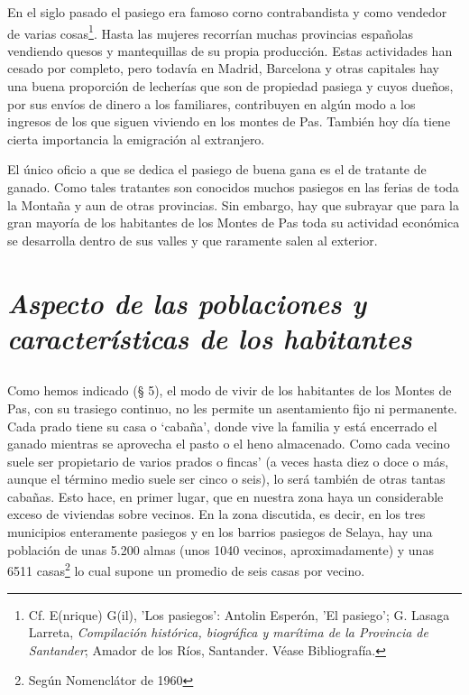 \documentclass[11pt,spanish,b5paper]{book}
\begin{document}
En el siglo pasado el pasiego era famoso corno contrabandista y como vendedor de varias cosas\footnote{Cf. E(nrique) G(il), 'Los pasiegos': Antolin Esperón, 'El pasiego'; G. Lasaga Larreta, \emph{Compilación histórica, biográfica y marítima de la Provincia de Santander}; Amador de los Ríos, Santander. Véase Bibliografía.}. Hasta las mujeres recorrían muchas provincias españolas vendiendo quesos y mantequillas de su propia producción. Estas actividades han cesado por completo, pero todavía en Madrid, Barcelona y otras capitales hay una buena proporción de lecherías que son de propiedad pasiega y cuyos dueños, por sus envíos de dinero a los familiares, contribuyen en algún modo a los ingresos de los que siguen viviendo en los montes de Pas. También hoy día tiene cierta importancia la emigración al extranjero.


El único oficio a que se dedica el pasiego de buena gana es el de tratante de ganado. Como tales tratantes son conocidos muchos pasiegos en las ferias de toda la Montaña y aun de otras provincias. Sin embargo, hay que subrayar que para la gran mayoría de los habitantes de los Montes de Pas toda su actividad económica se desarrolla dentro de sus valles y que raramente salen al exterior. 

\section{\emph{Aspecto de las poblaciones y características de los habitantes}}
\subsection{} Como hemos indicado (§ 5), el modo de vivir de los habitantes de los Montes de Pas, con su trasiego continuo, no les permite un asentamiento fijo ni permanente. Cada prado tiene su casa o `cabaña', donde vive la familia y está encerrado el ganado mientras se aprovecha el pasto o el heno almacenado. Como cada vecino suele ser propietario de varios prados o fincas' (a veces hasta diez o doce o más, aunque el término medio suele ser cinco o seis), lo será también de otras tantas cabañas. Esto hace, en primer lugar, que en nuestra zona haya un considerable exceso de viviendas sobre vecinos. En la zona discutida, es decir, en los tres municipios enteramente pasiegos y en los barrios pasiegos de Selaya, hay una población de unas 5.200 almas (unos 1040 vecinos, aproximadamente) y unas 6511 casas\footnote{Según Nomenclátor de 1960} lo cual supone un promedio de seis casas por vecino.
\end{document}
